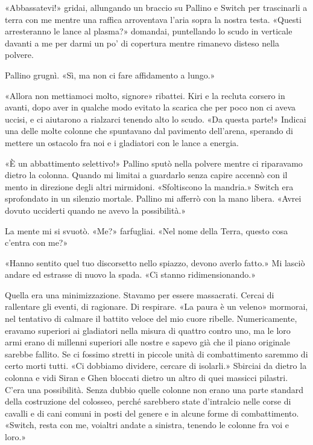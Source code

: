 «Abbassatevi!» gridai, allungando un braccio su Pallino e Switch per
trascinarli a terra con me mentre una raffica arroventava l'aria sopra
la nostra testa. «Questi arresteranno le lance al plasma?» domandai,
puntellando lo scudo in verticale davanti a me per darmi un po' di
copertura mentre rimanevo disteso nella polvere.

Pallino grugnì. «Sì, ma non ci fare affidamento a lungo.»

«Allora non mettiamoci molto, signore» ribattei. Kiri e la recluta
corsero in avanti, dopo aver in qualche modo evitato la scarica che per
poco non ci aveva uccisi, e ci aiutarono a rialzarci tenendo alto lo
scudo. «Da questa parte!» Indicai una delle molte colonne che spuntavano
dal pavimento dell'arena, sperando di mettere un ostacolo fra noi e i
gladiatori con le lance a energia.

«È un abbattimento selettivo!» Pallino sputò nella polvere mentre ci
riparavamo dietro la colonna. Quando mi limitai a guardarlo senza capire
accennò con il mento in direzione degli altri mirmidoni. «Sfoltiscono la
mandria.» Switch era sprofondato in un silenzio mortale. Pallino mi
afferrò con la mano libera. «Avrei dovuto ucciderti quando ne avevo la
possibilità.»

La mente mi si svuotò. «Me?» farfugliai. «Nel nome della Terra, questo
cosa c'entra con me?»

«Hanno sentito quel tuo discorsetto nello spiazzo, devono averlo fatto.»
Mi lasciò andare ed estrasse di nuovo la spada. «Ci stanno
ridimensionando.»

Quella era una minimizzazione. Stavamo per essere massacrati. Cercai di
rallentare gli eventi, di ragionare. Di respirare. «La paura è un
veleno» mormorai, nel tentativo di calmare il battito veloce del mio
cuore ribelle. Numericamente, eravamo superiori ai gladiatori nella
misura di quattro contro uno, ma le loro armi erano di millenni
superiori alle nostre e sapevo già che il piano originale sarebbe
fallito. Se ci fossimo stretti in piccole unità di combattimento saremmo
di certo morti tutti. «Ci dobbiamo dividere, cercare di isolarli.»
Sbirciai da dietro la colonna e vidi Siran e Ghen bloccati dietro un
altro di quei massicci pilastri. C'era una possibilità. Senza dubbio
quelle colonne non erano una parte standard della costruzione del
colosseo, perché sarebbero state d'intralcio nelle corse di cavalli e di
cani comuni in posti del genere e in alcune forme di combattimento.
«Switch, resta con me, voialtri andate a sinistra, tenendo le colonne
fra voi e loro.»

